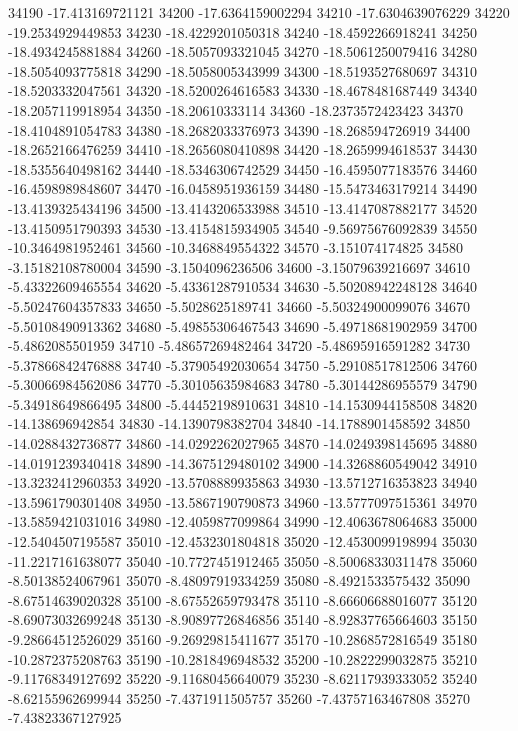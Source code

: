 {34190 -17.413169721121
34200 -17.6364159002294
34210 -17.6304639076229
34220 -19.2534929449853
34230 -18.4229201050318
34240 -18.4592266918241
34250 -18.4934245881884
34260 -18.5057093321045
34270 -18.5061250079416
34280 -18.5054093775818
34290 -18.5058005343999
34300 -18.5193527680697
34310 -18.5203332047561
34320 -18.5200264616583
34330 -18.4678481687449
34340 -18.2057119918954
34350 -18.20610333114
34360 -18.2373572423423
34370 -18.4104891054783
34380 -18.2682033376973
34390 -18.268594726919
34400 -18.2652166476259
34410 -18.2656080410898
34420 -18.2659994618537
34430 -18.5355640498162
34440 -18.5346306742529
34450 -16.4595077183576
34460 -16.4598989848607
34470 -16.0458951936159
34480 -15.5473463179214
34490 -13.4139325434196
34500 -13.4143206533988
34510 -13.4147087882177
34520 -13.4150951790393
34530 -13.4154815934905
34540 -9.56975676092839
34550 -10.3464981952461
34560 -10.3468849554322
34570 -3.151074174825
34580 -3.15182108780004
34590 -3.1504096236506
34600 -3.15079639216697
34610 -5.43322609465554
34620 -5.43361287910534
34630 -5.50208942248128
34640 -5.50247604357833
34650 -5.5028625189741
34660 -5.50324900099076
34670 -5.50108490913362
34680 -5.49855306467543
34690 -5.49718681902959
34700 -5.4862085501959
34710 -5.48657269482464
34720 -5.48695916591282
34730 -5.37866842476888
34740 -5.37905492030654
34750 -5.29108517812506
34760 -5.30066984562086
34770 -5.30105635984683
34780 -5.30144286955579
34790 -5.34918649866495
34800 -5.44452198910631
34810 -14.1530944158508
34820 -14.138696942854
34830 -14.1390798382704
34840 -14.1788901458592
34850 -14.0288432736877
34860 -14.0292262027965
34870 -14.0249398145695
34880 -14.0191239340418
34890 -14.3675129480102
34900 -14.3268860549042
34910 -13.3232412960353
34920 -13.5708889935863
34930 -13.5712716353823
34940 -13.5961790301408
34950 -13.5867190790873
34960 -13.5777097515361
34970 -13.5859421031016
34980 -12.4059877099864
34990 -12.4063678064683
35000 -12.5404507195587
35010 -12.4532301804818
35020 -12.4530099198994
35030 -11.2217161638077
35040 -10.7727451912465
35050 -8.50068330311478
35060 -8.50138524067961
35070 -8.48097919334259
35080 -8.4921533575432
35090 -8.67514639020328
35100 -8.67552659793478
35110 -8.66606688016077
35120 -8.69073032699248
35130 -8.90897726846856
35140 -8.92837765664603
35150 -9.28664512526029
35160 -9.26929815411677
35170 -10.2868572816549
35180 -10.2872375208763
35190 -10.2818496948532
35200 -10.2822299032875
35210 -9.11768349127692
35220 -9.11680456640079
35230 -8.62117939333052
35240 -8.62155962699944
35250 -7.4371911505757
35260 -7.43757163467808
35270 -7.43823367127925
}
